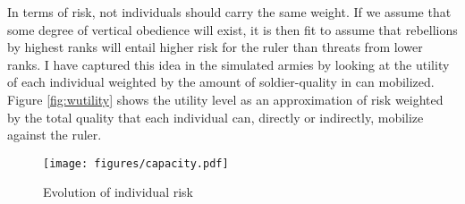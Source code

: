 In terms of risk, not individuals should carry the same weight. If we assume that some degree of vertical obedience will
exist, it is then fit to assume that rebellions by highest ranks will entail higher risk for the ruler than threats from
lower ranks. I have captured this idea in the simulated armies by looking at the utility of each individual weighted by
the amount of soldier-quality in can mobilized. Figure \ref{fig:wutility} shows the utility level as an approximation of
risk weighted by the total quality that each individual can, directly or indirectly, mobilize against the ruler.




  \begin{figure}[!h]
    \centering
    \caption{Evolution of individual risk}
    \texttt{[image: figures/capacity.pdf]}
    \label{fig:evolution}
  \end{figure}

